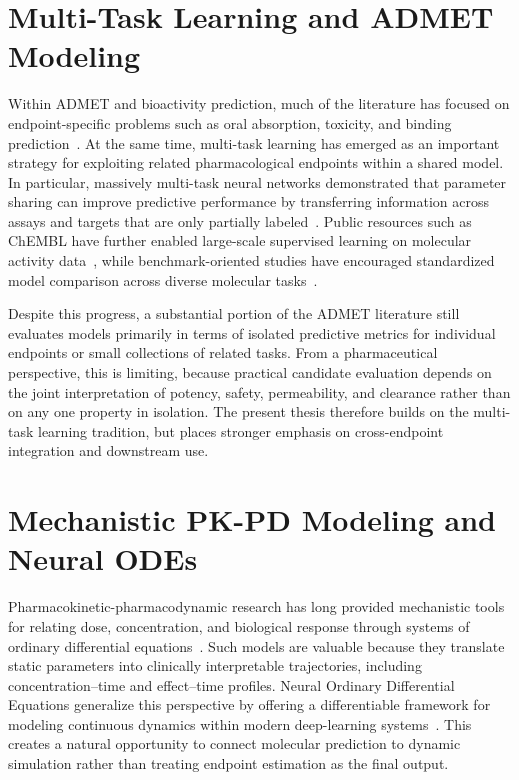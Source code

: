 \documentclass[a4paper,11pt,twoside]{report}
\begin{document}
\section{Multi-Task Learning and ADMET Modeling}

Within ADMET and bioactivity prediction, much of the literature has focused on endpoint-specific problems such as oral absorption, toxicity, and binding prediction~\cite{wang2016, hou2004, overton2019}. At the same time, multi-task learning has emerged as an important strategy for exploiting related pharmacological endpoints within a shared model. In particular, massively multi-task neural networks demonstrated that parameter sharing can improve predictive performance by transferring information across assays and targets that are only partially labeled~\cite{ramsundar2015}. Public resources such as ChEMBL have further enabled large-scale supervised learning on molecular activity data~\cite{gaulton2012}, while benchmark-oriented studies have encouraged standardized model comparison across diverse molecular tasks~\cite{wu2018}.

Despite this progress, a substantial portion of the ADMET literature still evaluates models primarily in terms of isolated predictive metrics for individual endpoints or small collections of related tasks. From a pharmaceutical perspective, this is limiting, because practical candidate evaluation depends on the joint interpretation of potency, safety, permeability, and clearance rather than on any one property in isolation. The present thesis therefore builds on the multi-task learning tradition, but places stronger emphasis on cross-endpoint integration and downstream use.

\section{Mechanistic PK-PD Modeling and Neural ODEs}

Pharmacokinetic-pharmacodynamic research has long provided mechanistic tools for relating dose, concentration, and biological response through systems of ordinary differential equations~\cite{toutain2010pkpd}. Such models are valuable because they translate static parameters into clinically interpretable trajectories, including concentration--time and effect--time profiles. Neural Ordinary Differential Equations generalize this perspective by offering a differentiable framework for modeling continuous dynamics within modern deep-learning systems~\cite{chen2018neuralode}. This creates a natural opportunity to connect molecular prediction to dynamic simulation rather than treating endpoint estimation as the final output.
\end{document}
